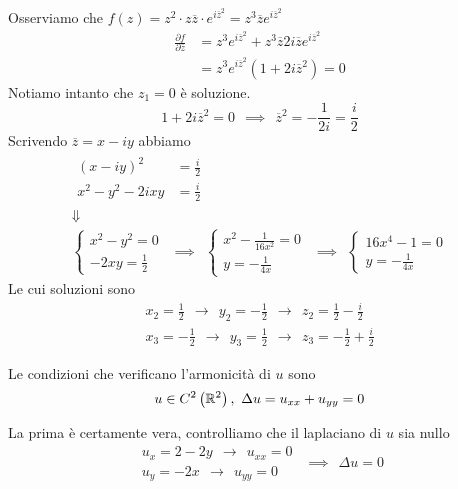 Osserviamo che $f\left( z\right) =z^{2} \cdotp z\overline{z} \cdotp e^{i\overline{z}^{2}} =z^{3}\overline{z} e^{i\overline{z}^{2}}$
\begin{align*}
\frac{\partial f}{\partial \overline{z}} & =z^{3} e^{i\overline{z}^{2}} +z^{3}\overline{z} 2i\overline{z} e^{i\overline{z}^{2}}\\
 & =z^{3} e^{i\overline{z}^{2}}\left( 1+2i\overline{z}^{2}\right) =0
\end{align*}
Notiamo intanto che $z_{1} =0$ è soluzione.
\begin{equation*}
1+2i\overline{z}^{2} =0\ \ \implies \ \ \overline{z}^{2} =-\frac{1}{2i} =\frac{i}{2}
\end{equation*}
Scrivendo $\overline{z} =x-iy$ abbiamo
\begin{gather*}
\begin{aligned}
\left( x-iy\right)^{2} & =\frac{i}{2}\\
x^{2} -y^{2} -2ixy & =\frac{i}{2}
\end{aligned}\\
\Downarrow \\
\begin{cases}
x^{2} -y^{2} =0\\
-2xy=\frac{1}{2}
\end{cases} \ \ \implies \ \ \begin{cases}
x^{2} -\frac{1}{16x^{2}} =0\\
y=-\frac{1}{4x}
\end{cases} \ \ \implies \ \ \begin{cases}
16x^{4} -1=0\\
y=-\frac{1}{4x}
\end{cases}
\end{gather*}
Le cui soluzioni sono
\begin{gather*}
x_{2} =\frac{1}{2} \ \ \rightarrow \ \ y_{2} =-\frac{1}{2} \ \ \rightarrow \ \ z_{2} =\frac{1}{2} -\frac{i}{2}\\
x_{3} =-\frac{1}{2} \ \ \rightarrow \ \ y_{3} =\frac{1}{2} \ \ \rightarrow \ \ z_{3} =-\frac{1}{2} +\frac{i}{2}
\end{gather*}
\Soluzione
\begin{defn}
Le condizioni che verificano l'armonicità di $u$ sono
\begin{equation}
u\in C^{2}\left(\RR ^{2}\right) ,\ \Delta u=u_{xx} +u_{yy} =0
\end{equation}
\end{defn}
La prima è certamente vera, controlliamo che il laplaciano di $u$ sia nullo
\begin{equation*}
\begin{array}{ r }
u_{x} =2-2y\ \ \rightarrow \ \ u_{xx} =0\\
u_{y} =-2x\ \ \rightarrow \ \ u_{yy} =0
\end{array} \ \ \implies \ \ \Delta u=0
\end{equation*}
